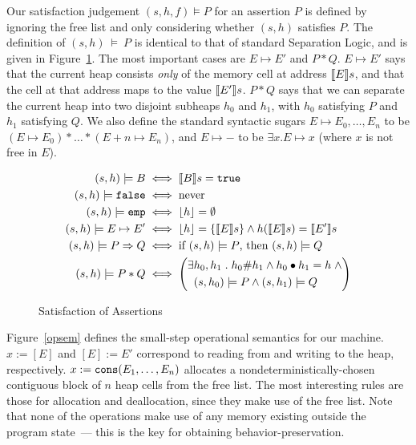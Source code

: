 Our satisfaction judgement $(s,h,f) \models P$ for an assertion $P$ is
defined by ignoring the free list and only considering whether $(s,h)$
satisfies $P$. The definition of $(s,h)~\models~P$ is identical to
that of standard Separation Logic, and is given in Figure~\ref{satisfaction}.
The most important cases are $E \mapsto E'$ and $P*Q$. $E
\mapsto E'$ says that the current heap consists \emph{only} of the
memory cell at address $\llbracket E \rrbracket s$, and that the cell at that address
maps to the value $\llbracket E' \rrbracket s$. $P*Q$ says that we can separate the
current heap into two disjoint subheaps $h_0$ and $h_1$, with $h_0$
satisfying $P$ and $h_1$ satisfying $Q$. We also define the standard
syntactic sugars $E \mapsto E_0,\ldots,E_n$ to be $(E \mapsto E_0) *
\ldots * (E+n \mapsto E_n)$, and $E \mapsto -$ to be $\exists x . E
\mapsto x$ (where $x$ is not free in $E$).

\begin{figure}[t]

\begin{align*}
(s,h) \models B & \iff \llbracket B \rrbracket s = \text{\tt{true}} \\
(s,h) \models \text{\tt{false}} & \iff \text{never} \\
(s,h) \models \text{\tt{emp}} & \iff \lfloor h \rfloor = \emptyset \\
(s,h) \models E \mapsto E' & \iff \lfloor h \rfloor = \{\llbracket E \rrbracket s\} \land h(\llbracket E \rrbracket s) = \llbracket E' \rrbracket s \\
(s,h) \models P \Rightarrow Q & \iff \text{if } (s,h) \models P \text{, then } (s,h) \models Q \\
(s,h) \models P*Q & \iff 
\left(\begin{aligned}
\exists & h_0, h_1 \hspace{1mm} . \hspace{1mm} h_0 \# h_1 \land h_0 \bullet h_1 = h \hspace{1mm} \land \\
& (s,h_0) \models P \land (s,h_1) \models Q
\end{aligned}\right)
\end{align*}

\caption{Satisfaction of Assertions}
\label{satisfaction}
\end{figure}


\ifextended

Figure~\ref{opsem} defines the small-step operational semantics for our 
machine. $x:=[E]$ and
$[E]:=E'$ correspond to reading from and writing to the heap, respectively. $x:=\text{\tt{cons}}(E_1,\ldots,E_n)$
allocates a nondeterministically-chosen contiguous block of $n$ heap cells from the free list.
The most interesting rules are those for allocation and deallocation, since they make use of the free list. 
Note that none of the operations make use of any memory existing outside the program state~---
this is the key for obtaining behavior-preservation.

